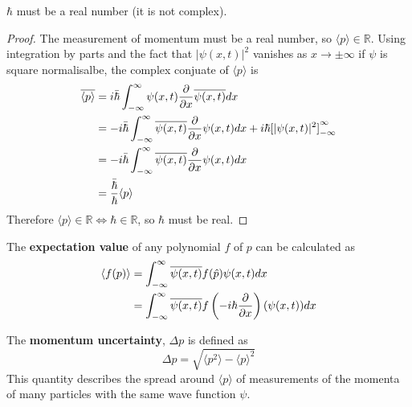 \begin{proposition}
	$\hbar$ must be a real number (it is not complex).
\end{proposition}

\begin{proof}
	The measurement of momentum must be a real number, so $\langle p \rangle \in \mathbb{R}$. Using integration by parts and the fact that $|\psi(x, t)|^2$ vanishes as $x \rightarrow \pm \infty$ if $\psi$ is square normalisalbe, the complex conjuate of $\langle p \rangle$ is
	\[
		\begin{aligned}
			\overline{\langle p \rangle}
				& = i \bar{\hbar} \int_{-\infty}^{\infty} \psi(x, t) \diffp{}{x} \overline{\psi(x, t)} dx \\
				& = -i \bar{\hbar} \int_{-\infty}^{\infty} \overline{\psi(x, t)} \diffp{}{x} \psi(x, t) dx + i \hbar {[|\psi(x, t)|^2]}_{-\infty}^{\infty} \\
				& = -i \bar{\hbar} \int_{-\infty}^{\infty} \overline{\psi(x, t)} \diffp{}{x} \psi(x, t) dx \\
				& = \frac{\bar{\hbar}}{\hbar} \langle p \rangle
		\end{aligned}
	\]
	Therefore $\langle p \rangle \in \mathbb{R} \Longleftrightarrow \hbar \in \mathbb{R}$, so $\hbar$ must be real.
\end{proof}

\begin{definition}
	The \textbf{expectation value} of any polynomial $f$ of $p$ can be calculated as
	\[
		\begin{aligned}
			\langle f(p) \rangle
				& = \int_{-\infty}^{\infty} \overline{\psi(x, t)} f(\hat{p}) \psi(x, t) dx \\
				& = \int_{-\infty}^{\infty} \overline{\psi(x, t)} f \left( -i \hbar \diffp{}{x} \right ) (\psi(x, t)) dx
		\end{aligned}
	\]
\end{definition}

\begin{definition}
	The \textbf{momentum uncertainty}, $\Delta p$ is defined as
	\[
		\Delta p = \sqrt{\langle p^2 \rangle - {\langle p \rangle}^2}
	\]
	This quantity describes the spread around $\langle p \rangle$ of measurements of the momenta of many particles with the same wave function $\psi$.
\end{definition}

